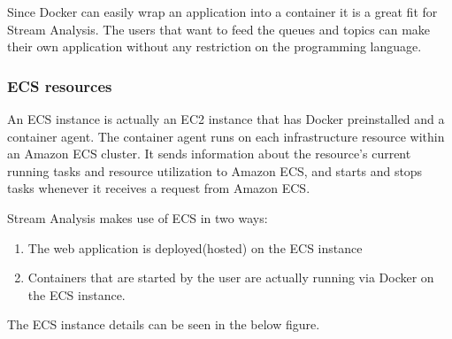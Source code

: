 Since Docker can easily wrap an application into a container it is a great fit for Stream Analysis. The users that want to feed the queues and topics can make their own application without any restriction on the programming language. 

\subsubsection{ECS resources}
\label{chap:04:03:01:03}

An ECS instance is actually an EC2 instance that has Docker preinstalled and a container agent. The container agent runs on each infrastructure resource within an Amazon ECS cluster. It sends information about the resource's current running tasks and resource utilization to Amazon ECS, and starts and stops tasks whenever it receives a request from Amazon ECS.

Stream Analysis makes use of ECS in two ways:
\begin{enumerate}
	\item The web application is deployed(hosted) on the ECS instance
	\item Containers that are started by the user are actually running via Docker on the ECS instance.
\end{enumerate}

The ECS instance details can be seen in the below figure.

